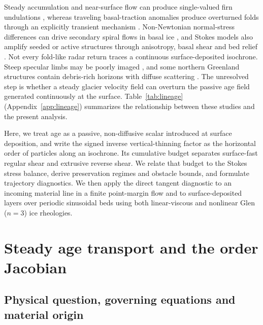 \documentclass[review]{igs}
\begin{document}
Steady accumulation and near-surface flow can produce single-valued firn undulations \citep{NgKing2011,NgKing2013}, whereas traveling basal-traction anomalies produce overturned folds through an explicitly transient mechanism \citep{Wolovick2014,WolovickCreyts2016}. Non-Newtonian normal-stress differences can drive secondary spiral flows in basal ice \citep{SchoofClarke2008}, and Stokes models also amplify seeded or active structures through anisotropy, basal shear and bed relief \citep{Zhang2024}. Not every fold-like radar return traces a continuous surface-deposited isochrone. Steep specular limbs may be poorly imaged \citep{Holschuh2014}, and some northern Greenland structures contain debris-rich horizons with diffuse scattering \citep{Holschuh2026}. The unresolved step is whether a steady glacier velocity field can overturn the passive age field generated continuously at the surface. Table~\ref{tab:lineage} (Appendix~\ref{app:lineage}) summarizes the relationship between these studies and the present analysis.

Here, we treat age as a passive, non-diffusive scalar introduced at surface deposition, and write the signed inverse vertical-thinning factor as the horizontal order of particles along an isochrone. Its cumulative budget separates surface-fast regular shear and extrusive reverse shear. We relate that budget to the Stokes stress balance, derive preservation regimes and obstacle bounds, and formulate trajectory diagnostics. We then apply the direct tangent diagnostic to an incoming material line in a finite point-margin flow and to surface-deposited layers over periodic sinusoidal beds using both linear-viscous and nonlinear Glen (\(n=3\)) ice rheologies.

\section{Steady age transport and the order Jacobian}

\subsection{Physical question, governing equations and material origin}
\end{document}

